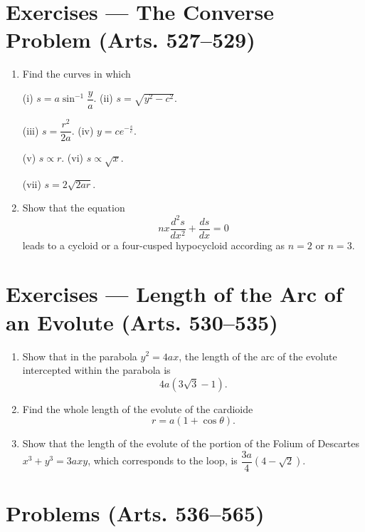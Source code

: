 \documentclass[11pt, a4paper]{article}
\begin{document}
\section*{Exercises --- The Converse Problem (Arts. 527--529)}

\begin{enumerate}[leftmargin=2em]

\item Find the curves in which

(i) $s=a\sin^{-1}\dfrac{y}{a}$.   (ii) $s=\sqrt{y^2-c^2}$.

(iii) $s=\dfrac{r^2}{2a}$.   (iv) $y=ce^{-\frac{s}{c}}$.

(v) $s\propto r$.   (vi) $s\propto\sqrt{x}$.

(vii) $s=2\sqrt{2ar}$.

\item Show that the equation
\[
nx\frac{d^2s}{dx^2}+\frac{ds}{dx}=0
\]
leads to a cycloid or a four-cusped hypocycloid according as $n=2$ or $n=3$.

\end{enumerate}

\section*{Exercises --- Length of the Arc of an Evolute (Arts. 530--535)}

\begin{enumerate}[leftmargin=2em]

\item Show that in the parabola $y^2=4ax$, the length of the arc of the evolute intercepted within the parabola is
\[
4a(3\sqrt3-1).
\]

\item Find the whole length of the evolute of the cardioide
\[
r=a(1+\cos\theta).
\]

\item Show that the length of the evolute of the portion of the Folium of Descartes $x^3+y^3=3axy$, which corresponds to the loop, is $\dfrac{3a}{4}(4-\sqrt2)$.

\end{enumerate}

\section*{Problems (Arts. 536--565)}
\end{document}
